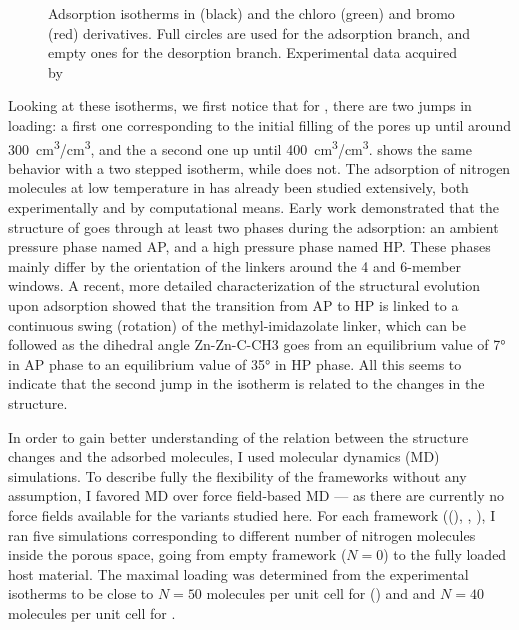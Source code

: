 \documentclass[thesis]{subfiles}
\begin{document}
\begin{figure}[ht]
    \centering
    
    \caption{Adsorption isotherms in  (black) and the chloro (green) and
    bromo (red) derivatives. Full circles are used for the adsorption branch,
    and empty ones for the desorption branch. Experimental data acquired by
    \citeauthor{Chaplais2018}\cite{Chaplais2018}}
    \label{fig:zif8x:isotherms}
\end{figure}

Looking at these isotherms, we first notice that for , there are two jumps
in loading: a first one corresponding to the initial filling of the pores up
until around \SI{300}{cm^3/cm^3}, and the a second one up until
\SI{400}{cm^3/cm^3}. \ZIFCl shows the same behavior with a two stepped isotherm,
while \ZIFBr does not. The adsorption of nitrogen molecules at low temperature
in  has already been studied extensively, both experimentally and by
computational means. Early work demonstrated that the structure of  goes
through at least two phases during the adsorption: an ambient pressure phase
named AP, and a high pressure phase named HP. These phases mainly differ by the
orientation of the linkers around the 4 and 6-member
windows.\cite{FairenJimenez2011} A recent, more detailed characterization of the
structural evolution upon adsorption showed that the transition from AP to HP is
linked to a continuous swing (rotation) of the methyl-imidazolate linker, which
can be followed as the dihedral angle Zn-Zn-C-CH3 goes from an equilibrium value
of 7° in AP phase to an equilibrium value of 35° in HP phase.\cite{Coudert2017}
All this seems to indicate that the second jump in the isotherm is related to
the changes in the structure.

In order to gain better understanding of the relation between the structure
changes and the adsorbed molecules, I used molecular dynamics (MD) simulations.
To describe fully the flexibility of the frameworks without any assumption, I
favored \abinitio MD over force field-based MD --- as there are currently no
force fields available for the  variants studied here. For each framework
((), \ZIFCl, \ZIFBr), I ran five simulations corresponding to
different number of nitrogen molecules inside the porous space, going from empty
framework ($N = 0$) to the fully loaded host material. The maximal loading was
determined from the experimental isotherms to be close to $N = 50$ molecules per
unit cell for () and \ZIFCl and $N = 40$ molecules per unit cell
for \ZIFBr.
\end{document}
